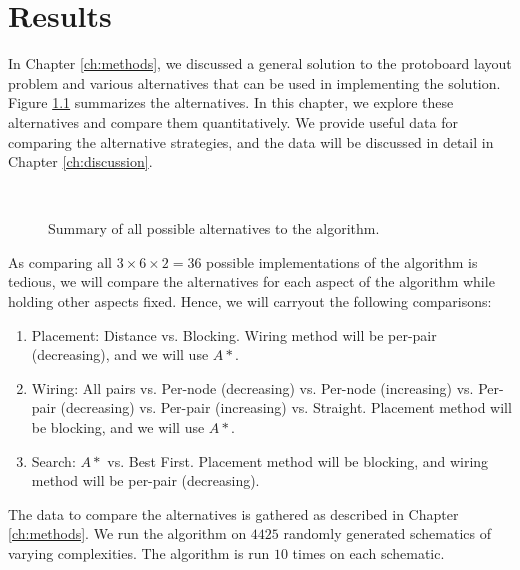 
\chapter{Results}
\label{ch:results}

In Chapter \ref{ch:methods}, we discussed a general solution to the protoboard
layout problem and various alternatives that can be used in implementing the
solution. Figure \ref{fig:alternatives} summarizes the alternatives.
In this chapter, we explore these alternatives and compare them quantitatively.
We provide useful data for comparing the alternative strategies,
and the data will be discussed in detail in Chapter \ref{ch:discussion}.

\begin{figure}[H]
\centering
{}
\hspace{1cm}
\\
\label{fig:alternatives}
\caption[Algorithm alternatives summary]{Summary of all possible alternatives
to the algorithm.}
\end{figure}

As comparing all $3 \times 6 \times 2 = 36$ possible implementations of the
algorithm is tedious, we
will compare the alternatives for each aspect of the algorithm while holding
other aspects fixed. Hence, we will carryout the following comparisons:

\begin{enumerate}
\item Placement: Distance vs. Blocking. Wiring method will be per-pair
(decreasing), and we will use $A*$.
\item Wiring: All pairs vs. Per-node (decreasing) vs. Per-node (increasing) vs.
Per-pair (decreasing) vs. Per-pair (increasing) vs. Straight.
Placement method will be blocking, and we will use $A*$.
\item Search: $A*$ vs. Best First. Placement method will be blocking, and wiring
method will be per-pair (decreasing).
\end{enumerate}

The data to compare the alternatives is gathered as described in Chapter
\ref{ch:methods}. We run the algorithm on $4425$ randomly generated schematics
of varying complexities. The algorithm is run $10$ times on each schematic.

